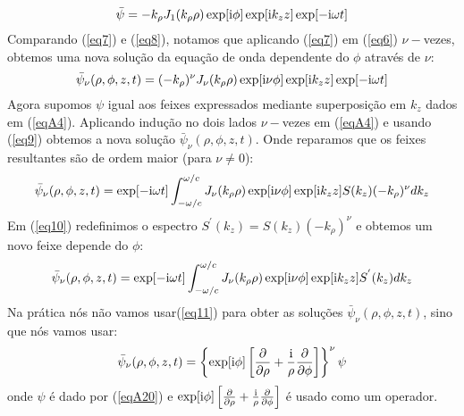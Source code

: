 \begin{equation}\label{eq8}
\bar{\psi} =-k_{\rho}J_1(k_{\rho}\rho)\exp[{\rm i}\phi]\exp[{\rm i}k_z z]\exp[{-\rm i}\omega t]
\end{equation}
Comparando (\ref{eq7}) e (\ref{eq8}), notamos que aplicando (\ref{eq7}) em (\ref{eq6}) $\nu -$vezes, obtemos uma nova solução da equação de onda dependente do $\phi$ através de $\nu$:
\begin{equation}\label{eq9}
\bar{\psi}_{\nu}(\rho,\phi,z,t) =(-k_{\rho})^{\nu}J_{\nu}(k_{\rho}\rho)\exp[{\rm i}\nu\phi]\exp[{\rm i}k_z z]\exp[{-\rm i}\omega t]
\end{equation}
Agora supomos $\psi$ igual aos feixes expressados mediante superposição em $k_z$ dados em (\ref{eqA4}). Aplicando indução no dois lados $\nu -$vezes em (\ref{eqA4}) e usando (\ref{eq9}) obtemos a nova solução $\bar{\psi}_{\nu}(\rho,\phi,z,t)$. Onde reparamos que os feixes resultantes s\~ao de ordem maior (para $\nu \neq 0$):
\begin{equation}\label{eq10}
\bar{\psi}_{\nu}(\rho,\phi,z,t) =\exp[{-\rm i}\omega t]\int^{\omega/c}_{-\omega/c}J_{\nu}(k_{\rho}\rho)\exp[{\rm i}\nu\phi]\exp[{\rm i}k_z z]S(k_z)(-k_{\rho})^{\nu} dk_z
\end{equation}
Em (\ref{eq10}) redefinimos o espectro $S^{'}(k_z)=S(k_z)(-k_{\rho})^{\nu}$ e obtemos um novo feixe depende do $\phi$:
\begin{equation}\label{eq11}
\bar{\psi}_{\nu}(\rho,\phi,z,t) =\exp[{-\rm i}\omega t]\int^{\omega/c}_{-\omega/c}J_{\nu}(k_{\rho}\rho)\exp[{\rm i}\nu\phi]\exp[{\rm i}k_z z]S^{'}(k_z) dk_z
\end{equation}
Na prática nós não vamos usar(\ref{eq11}) para obter as soluções $\bar{\psi}_{\nu}(\rho,\phi,z,t)$, sino que nós vamos usar:
\begin{equation}\label{eq12}
\bar{\psi}_{\nu}(\rho,\phi,z,t) = \left\{ \exp[{\rm i}\phi] \left[\frac{\partial}{\partial\rho}+\frac{\rm i}{\rho}\frac{\partial}{\partial\phi} \right]\right\}^{\nu}\psi
\end{equation}
onde $\psi$ é dado por (\ref{eqA20}) e $\exp[{\rm i}\phi] \left[\frac{\partial}{\partial\rho}+\frac{\rm i}{\rho}\frac{\partial}{\partial\phi} \right]$ é usado como um operador.
 
